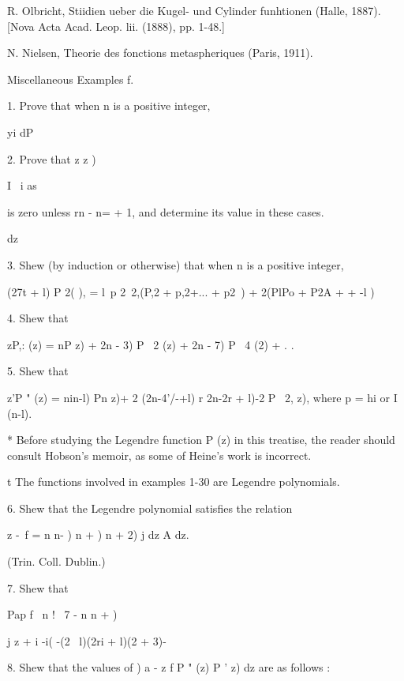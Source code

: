 {{{{R. Olbricht, Stiidien ueber die Kugel- und Cylinder funhtionen (Halle,
1887). [Nova Acta Acad. Leop. lii. (1888), pp. 1-48.]

N. Nielsen, Theorie des fonctions metaspheriques (Paris, 1911).

Miscellaneous Examples f.

1. Prove that when n is a positive integer,


yi dP

2. Prove that z z )

I \ i as

is zero unless rn - n= + 1, and determine its value in these cases.

dz


3. Shew (by induction or otherwise) that when n is a positive integer,

(27t + l) P 2( ), = l\ p 2\ 2,(P,2 + p,2+... + p2 \,) + 2(PlPo + P2A
+ + -l ) 

4. Shew that

zP,: (z) = nP z) + 2n - 3) P \ 2 (z) + 2n - 7) P \ 4 (2) + .  . 


5. Shew that

z'P " (z) = nin-l) Pn z)+ 2 (2n-4'/-+l) r 2n-2r + l)-2 P \ 2, z),
where p = hi or I (n-l). 

* Before studying the Legendre function P (z) in this treatise, the
reader should consult Hobson's memoir, as some of Heine's work is
incorrect.

t The functions involved in examples 1-30 are Legendre polynomials.

%
%

6. Shew that the Legendre polynomial satisfies the relation

 z -\ f = n n- ) n + ) n + 2) j dz A dz.

(Trin. Coll. Dublin.)

7. Shew that

Pap f \ n ! \ 7 - n n + ) \

j z + i -i( -(2 \ l)(2ri + l)(2 + 3)-


8. Shew that the values of ) a - z f P " (z) P ' z) dz are as follows
:

}}}}
